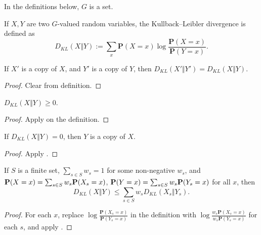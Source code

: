 In the definitions below, $G$ is a set.

\begin{definition}\label{kl-div}\leanok If $X,Y$ are two $G$-valued random variables, the Kullback--Leibler divergence is defined as
  $$ D_{KL}(X\Vert Y) := \sum_x \mathbf{P}(X=x) \log \frac{\mathbf{P}(X=x)}{\mathbf{P}(Y=x)}.$$
\end{definition}

\begin{lemma}
  \label{kl-div-copy}
  \leanok

  If $X'$ is a copy of $X$, and $Y'$ is a copy of $Y$, then $D_{KL}(X'\Vert Y') = D_{KL}(X\Vert Y)$.
\end{lemma}

\begin{proof}\leanok  Clear from definition.
\end{proof}

\begin{lemma}\label{Gibbs}\leanok  $D_{KL}(X\Vert Y) \geq 0$.
\end{lemma}

\begin{proof}\leanok
  Apply  on the definition.
\end{proof}

\begin{lemma}\label{Gibbs-converse}\leanok  If $D_{KL}(X\Vert Y) = 0$, then $Y$ is a copy of $X$.
\end{lemma}

\begin{proof}\leanok
  Apply .
\end{proof}

\begin{lemma}\label{kl-div-convex}\leanok  If $S$ is a finite set, $\sum_{s \in S} w_s = 1$ for some non-negative $w_s$, and ${\bf P}(X=x) = \sum_{s\in S} w_s  {\bf P}(X_s=x)$, ${\bf P}(Y=x) = \sum_{s\in S} w_s  {\bf P}(Y_s=x)$ for all $x$, then
$$D_{KL}(X\Vert Y) \le \sum_{s\in S} w_s D_{KL}(X_s\Vert Y_s).$$
\end{lemma}

\begin{proof}\leanok
For each $x$, replace $\log \frac{\mathbf{P}(X_s=x)}{\mathbf{P}(Y_s=x)}$ in the definition with $\log \frac{w_s\mathbf{P}(X_s=x)}{w_s\mathbf{P}(Y_s=x)}$ for each $s$, and apply .
\end{proof}


